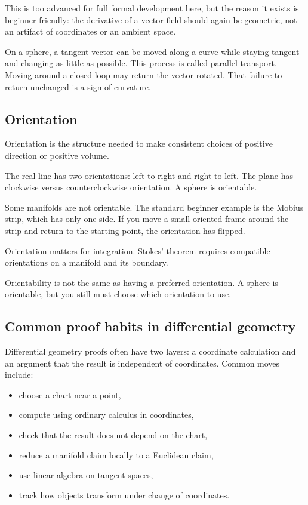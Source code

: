 This is too advanced for full formal development here, but the reason it exists
is beginner-friendly: the derivative of a vector field should again be geometric,
not an artifact of coordinates or an ambient space.

\begin{example}
On a sphere, a tangent vector can be moved along a curve while staying tangent
and changing as little as possible. This process is called parallel transport.
Moving around a closed loop may return the vector rotated. That failure to
return unchanged is a sign of curvature.
\end{example}

\subsection{Orientation}

Orientation is the structure needed to make consistent choices of positive
direction or positive volume.

\begin{example}
The real line has two orientations: left-to-right and right-to-left. The plane
has clockwise versus counterclockwise orientation. A sphere is orientable.
\end{example}

Some manifolds are not orientable. The standard beginner example is the Mobius
strip, which has only one side. If you move a small oriented frame around the
strip and return to the starting point, the orientation has flipped.

Orientation matters for integration. Stokes' theorem requires compatible
orientations on a manifold and its boundary.

\begin{trapbox}
Orientability is not the same as having a preferred orientation. A sphere is
orientable, but you still must choose which orientation to use.
\end{trapbox}

\subsection{Common proof habits in differential geometry}

Differential geometry proofs often have two layers: a coordinate calculation
and an argument that the result is independent of coordinates. Common moves
include:

\begin{itemize}
\item choose a chart near a point,
\item compute using ordinary calculus in coordinates,
\item check that the result does not depend on the chart,
\item reduce a manifold claim locally to a Euclidean claim,
\item use linear algebra on tangent spaces,
\item track how objects transform under change of coordinates.
\end{itemize}

